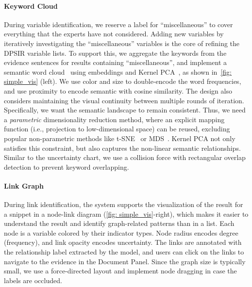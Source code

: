 \vspace*{-0.1cm}
\paragraph{Keyword Cloud}
During variable identification, we reserve a label for ``miscellaneous'' to cover everything that the experts have not considered. Adding new variables by iteratively investigating the ``miscellaneous'' variables is the core of refining the DPSIR variable lists. To support this, we aggregate the keywords from the evidence sentences for results containing ``miscellaneous'', and implement a semantic word cloud~\cite{xu2016semanticwordcloud} using embeddings and Kernel PCA~\cite{scholkopf1997kernel}, as shown in~\autoref{fig: simple_vis} (left).
We use color and size to double-encode the word frequencies, and use proximity to encode semantic with cosine similarity.
The design also considers maintaining the visual continuity between multiple rounds of iteration.
Specifically, we want the semantic landscape to remain consistent.
Thus, we need a \textit{parametric} dimensionality reduction method, where an explicit mapping function (i.e., projection to low-dimensional space) can be reused, excluding popular non-parametric methods like t-SNE~\cite{van2008tsne} or MDS~\cite{cox2000mds}.
Kernel PCA not only satisfies this constraint, but also captures the non-linear semantic relationships. Similar to the uncertainty chart, we use a collision force with rectangular overlap detection to prevent keyword overlapping.

\vspace*{-0.1cm}
\paragraph{Link Graph}
During link identification, the system supports the visualization of the result for a snippet in a node-link diagram (\autoref{fig: simple_vis}-right), which makes it easier to understand the result and identify graph-related patterns than in a list. Each node is a variable colored by their indicator types. Node radius encodes degree (frequency), and link opacity encodes uncertainty. The links are annotated with the relationship label extracted by the model, and users can click on the links to navigate to the evidence in the Document Panel. Since the graph size is typically small, we use a force-directed layout and implement node dragging in case the labels are occluded. 


